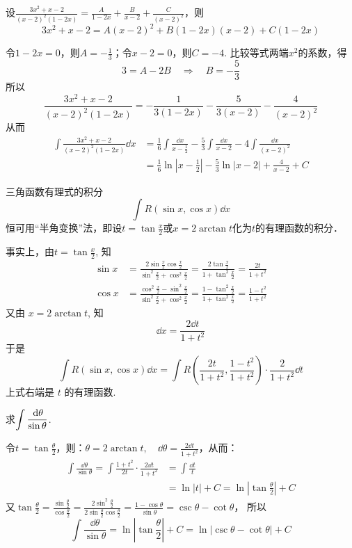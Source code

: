 \begin{solution}
设$\frac{3x^2+x-2}{(x-2)^2(1-2x)}=\frac{A}{1-2x}+\frac{B}{x-2}+\frac{C}{(x-2)^2}$，则
\[3x^2+x-2=A(x-2)^2+B(1-2x)(x-2)+C(1-2x)\]

令$1-2x=0$，则$A=-\frac{1}{3}$；令$x-2=0$，则$C=-4$. 比较等式两端$x^2$的系数，得
\[3=A-2B\quad\Rightarrow\quad B=-\frac{5}{3}\]
所以
\[\frac{3x^2+x-2}{(x-2)^2(1-2x)}=-\frac{1}{3(1-2x)}-\frac{5}{3(x-2)}-\frac{4}{(x-2)^2}\]
从而
\[\begin{split}
\int \frac{3x^2+x-2}{(x-2)^2(1-2x)}\dd x &=\frac{1}{6}\int \frac{\dd x}{x-\frac{1}{2}}-\frac{5}{3}\int \frac{\dd x}{x-2}-4\int \frac{\dd x}{(x-2)^2}\\
&=\frac{1}{6}\ln\left|x-\frac{1}{2}\right|-\frac{5}{3}\ln|x-2|+\frac{4}{x-2}+C
\end{split}\]
\end{solution}

三角函数有理式的积分
\[\int R (\sin x,\cos x) \dd x\]
恒可用“半角变换”法，即设$t=\tan\frac{x}{2}$或$x=2\arctan t$化为$t$的有理函数的积分．

事实上，由$t=\tan\frac{x}{2}$, 知
\[\begin{split}
\sin x&=\frac{2 \sin \frac{x}{2} \cos \frac{x}{2}}{\sin ^{2} \frac{x}{2}+\cos ^{2} \frac{x}{2}}=\frac{2 \tan \frac{x}{2}}{1+\tan^{2} \frac{x}{2}}=\frac{2 t}{1+t^{2}}\\
\cos x &=\frac{\cos ^{2}\frac{x}{2}-\sin ^{2} \frac{x}{2}}{\sin ^{2} \frac{x}{2}+\cos ^{2} \frac{x}{2}}=\frac{1-\tan^{2} \frac{x}{2}}{1+\tan^{2} \frac{x}{2}} 
=\frac{1-t^{2}}{1+t^{2}}
\end{split}\]
又由 $x=2 \arctan t$, 知
\[\dd x=\frac{2 \dd t}{1+t^{2}}\]
于是
\[
\int R(\sin x,  \cos x) \dd x=\int R\left(\frac{2 t}{1+t^{2}}, \frac{1-t^{2}}{1+t^{2}}\right) \cdot \frac{2}{1+t^{2}} \dd t
\]
上式右端是 $t$ 的有理函数.

\begin{example}
    求$\displaystyle\int \dfrac{\,{\rm d}\theta}{\sin\theta}$.
\end{example}

\begin{solution}
令$t=\tan\frac{\theta}{2}$，则：$\theta=2\arctan t,\quad \dd\theta=\frac{2\dd t}{1+t^2}$，从而：
\[\begin{split}
    \int\frac{\dd\theta}{\sin\theta}=\int\frac{1+t^2}{2t}\cdot \frac{2\dd t}{1+t^2}&=\int\frac{\dd t}{t}\\
    &=\ln|t|+C=\ln\left|\tan\frac{\theta}{2}\right|+C
\end{split}\]
又$\tan\frac{\theta}{2}=\frac{\sin\frac{\theta}{2}}{\cos\frac{\theta}{2}}=\frac{2\sin^2 \frac{\theta}{2}}{2\sin\frac{\theta}{2}\cos \frac{\theta}{2}}=\frac{1-\cos\theta}{\sin\theta}=\csc\theta-\cot\theta$，
所以
\[\int\frac{\dd\theta}{\sin\theta}=\ln\left|\tan\frac{\theta}{2}\right|+C=\ln|\csc\theta-\cot\theta|+C\]    
\end{solution}


